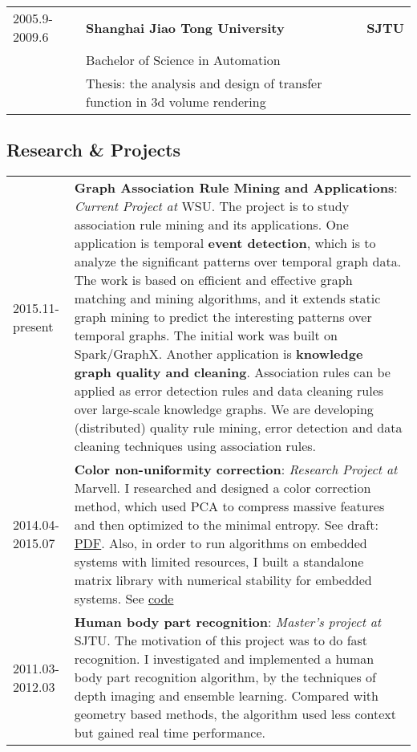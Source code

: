 \documentclass[10pt, a4paper]{article}
\begin{document}
\begin{center}
\begin{tabularx}{\linewidth}{lXr}
2005.9-2009.6 & \textbf{Shanghai Jiao Tong University} & \textbf{SJTU}\\
 & Bachelor of Science in Automation & \\
 & Thesis: the analysis and design of transfer function in 3d volume rendering & \\
\end{tabularx}
\end{center}

\subsection*{Research \& Projects}
\label{sec-1-2}
\begin{center}
\begin{tabularx}{\linewidth}{lX}
2015.11-present & \textbf{Graph Association Rule Mining and Applications}: \emph{Current Project at} WSU. The project is to study association rule mining and its applications. One application is temporal \textbf{event detection}, which is to analyze the significant patterns over temporal graph data. The work is based on efficient and effective graph matching and mining algorithms, and it extends static graph mining to predict the interesting patterns over temporal graphs. The initial work was built on Spark/GraphX. Another application is \textbf{knowledge graph quality and cleaning}. Association rules can be applied as error detection rules and data cleaning rules over large-scale knowledge graphs. We are developing (distributed) quality rule mining, error detection and data cleaning techniques using association rules.\\
2014.04-2015.07 & \textbf{Color non-uniformity correction}: \emph{Research Project at} Marvell. I researched and designed a color correction method, which used PCA to compress massive features and then optimized to the minimal entropy. See draft: {\href{https://docs.google.com/viewer?a=v&pid=sites&srcid=ZGVmYXVsdGRvbWFpbnxwZW5nbGluMDN8Z3g6N2M0OGZkNWNlY2E4MzY1MA}{PDF}}. Also, in order to run algorithms on embedded systems with limited resources, I built a standalone matrix library with numerical stability for embedded systems. See {\href{https://github.com/penglin03/Numic}{code}}\\
2011.03-2012.03 & \textbf{Human body part recognition}: \emph{Master's project at} SJTU. The motivation of this project was to do fast recognition. I investigated and implemented a human body part recognition algorithm, by the techniques of depth imaging and ensemble learning. Compared with geometry based methods, the algorithm used less context but gained real time performance.\\
\end{tabularx}
\end{center}
\end{document}

